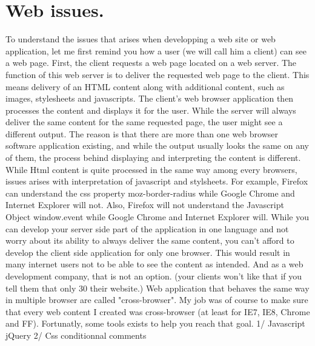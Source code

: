 \section{Web issues.}

 
To understand the issues that arises when developping a web site or web application, let me first remind you how a 
user (we will call him a client) can see a web page. First, the client requests a web page located on a web server. The function of this web server is 
to deliver the requested web page to the client. This means delivery of an HTML content along with additional content, 
such as images, stylesheets and javascripts. The client's web browser application then processes the content and displays it for the user. 
While the server will always deliver the same content for the same requested page, the user might see a different output. 
The reason is that there are more than one web browser software application existing, and while the output usually looks the same on any of them, the process behind 
displaying and interpreting the content is different. While Html content is quite processed in the same way among every browsers, issues arises with interpretation of
javascript and stylsheets. For example, Firefox can understand the css property moz-border-radius while Google Chrome and Internet Explorer will not. Also, Firefox 
will not understand the Javascript Object window.event while Google Chrome and Internet Explorer will.
While you can develop your server side part of the application in one language and not worry about its ability to always deliver the same content, you can't afford to
develop the client side application for only one browser. This would result in many internet users not to be able to see the content as intended.
And as a web development company, that is not an option. (your clients won't like that if you tell them that only 30 %
their website.)
Web application that behaves the same way in multiple browser are called "cross-browser". 
My job was of course to make sure that every web content I created was cross-browser (at least for IE7, IE8, Chrome and FF).
Fortunatly, some tools exists to help you reach that goal.
1/ Javascript
jQuery
2/ Css
conditionnal comments
